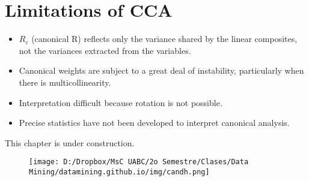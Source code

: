 \documentclass[]{book}
\providecommand{\tightlist}{%
  \setlength{\itemsep}{0pt}\setlength{\parskip}{0pt}}
\begin{document}
\section{Limitations of CCA}\label{limitations-of-cca}

\begin{itemize}
\tightlist
\item
  \(R_c\) (canonical R) reflects only the variance shared by the linear
  composites, not the variances extracted from the variables.
\item
  Canonical weights are subject to a great deal of instability,
  particularly when there is multicollinearity.
\item
  Interpretation difficult because rotation is not possible.
\item
  Precise statistics have not been developed to interpret canonical
  analysis.
\end{itemize}

This chapter is under construction.

\begin{figure}[htbp]
\centering
\texttt{[image: D:/Dropbox/MsC UABC/2o Semestre/Clases/Data Mining/datamining.github.io/img/candh.png]}
\caption{}
\end{figure}


\end{document}
